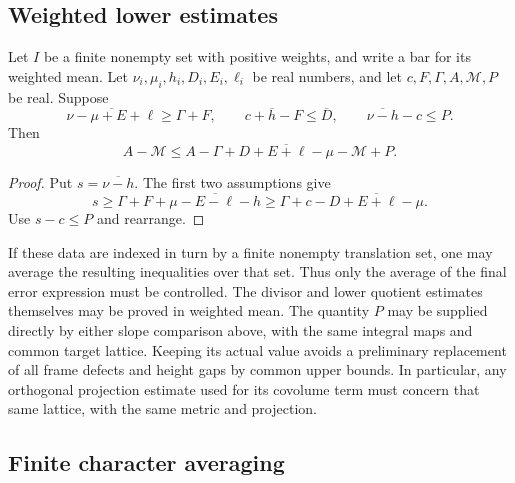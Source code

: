 \subsection{Weighted lower estimates}

\begin{lemma}\label{cs-weighted-lower}
Let $I$ be a finite nonempty set with positive weights, and write a bar
for its weighted mean. Let $\nu_i,\mu_i,h_i,D_i,E_i,\ell_i$ be real
numbers, and let $c,F,\Gamma,A,\mathcal M,P$ be real. Suppose
\[
 \overline{\nu-\mu+E+\ell}\ge\Gamma+F,
 \qquad c+\overline h-F\le\overline D,
 \qquad \overline{\nu-h}-c\le P.
\]
Then
\[
 A-\mathcal M\le A-\Gamma+
       \overline{D+E+\ell-\mu}-\mathcal M+P.
\]
\end{lemma}
\begin{proof}
Put $s=\overline{\nu-h}$. The first two assumptions give
\[
 s\ge\Gamma+F+\overline{\mu-E-\ell-h}
   \ge\Gamma+c-\overline{D+E+\ell-\mu}.
\]
Use $s-c\le P$ and rearrange.
\end{proof}

If these data are indexed in turn by a finite nonempty translation set,
one may average the resulting inequalities over that set. Thus only the
average of the final error expression must be controlled. The divisor
and lower quotient estimates themselves may be proved in weighted mean.
The quantity $P$ may be supplied directly by either slope comparison
above, with the same integral maps and common target lattice. Keeping
its actual value avoids a preliminary replacement of all frame defects
and height gaps by common upper bounds. In particular, any orthogonal
projection estimate used for its covolume term must concern that same
lattice, with the same metric and projection.

\subsection{Finite character averaging}

